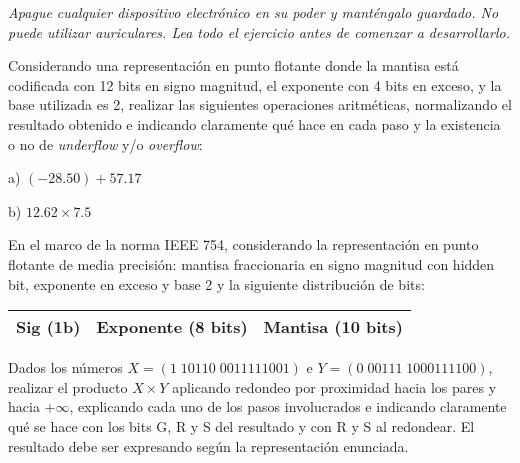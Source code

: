 \documentclass[12pt,a4paper]{article}
\begin{document}

\begin{centering}
\textit{Apague cualquier dispositivo electrónico en su poder y manténgalo guardado. No puede utilizar auriculares. Lea todo el ejercicio antes de comenzar a desarrollarlo.}
\end{centering}

 Considerando una representación en punto flotante donde la mantisa está codificada con 12 bits en signo magnitud, el exponente con 4 bits en exceso, y la base utilizada es 2, realizar las siguientes operaciones aritméticas, normalizando el resultado obtenido e indicando claramente qué hace en cada paso y la existencia o no de \textit{underflow} y/o \textit{overflow}: \\ [2mm]
\begin{minipage}{0.5\textwidth}
	\centering a) $(-28.50) + 57.17$ 
\end{minipage}    
\begin{minipage}   {0.3\textwidth}	               
	\centering b) $12.62 \times 7.5$
\end{minipage}


 En el marco de la norma IEEE 754, considerando la representación en punto flotante de media precisión: mantisa fraccionaria en signo magnitud con hidden bit, exponente en exceso y base 2 y la siguiente distribución de bits:
\begin{center}
	\begin{tabular}{|c|c|c|}\hline
		Sig (1b) & Exponente (8 bits) & Mantisa (10 bits)\\\hline
	\end{tabular}
\end{center}

Dados los números $X = (1\; 10110\; 0011111001)$ e $Y = (0\; 00111\; 1000111100)$, realizar el producto $X \times Y$ aplicando redondeo por proximidad hacia los pares y hacia $+\infty$, explicando cada uno de los pasos involucrados e indicando claramente qué se hace con los bits G, R y S del resultado y con R y S al redondear. El resultado debe ser expresando según la representación enunciada.

%
%
\end{document}
